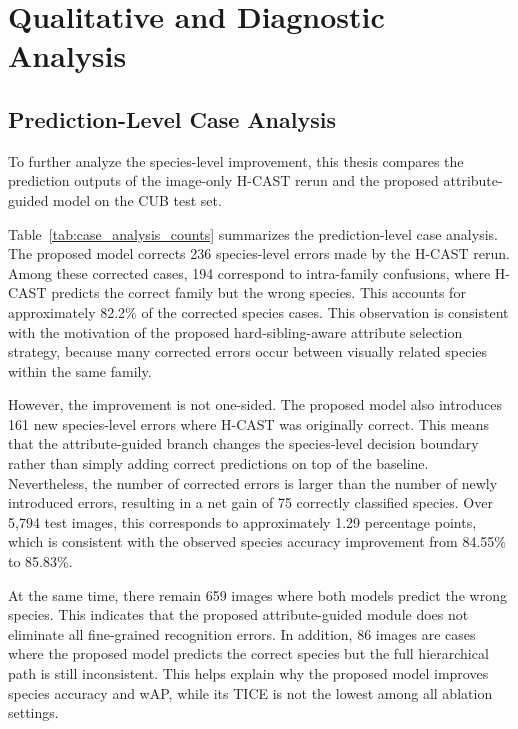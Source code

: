 \section{Qualitative and Diagnostic Analysis}















\subsection{Prediction-Level Case Analysis}

To further analyze the species-level improvement, this thesis compares the prediction outputs of the image-only H-CAST rerun and the proposed attribute-guided model on the CUB test set.

Table~\ref{tab:case_analysis_counts} summarizes the prediction-level case analysis. The proposed model corrects 236 species-level errors made by the H-CAST rerun. Among these corrected cases, 194 correspond to intra-family confusions, where H-CAST predicts the correct family but the wrong species. This accounts for approximately 82.2\% of the corrected species cases. This observation is consistent with the motivation of the proposed hard-sibling-aware attribute selection strategy, because many corrected errors occur between visually related species within the same family.

However, the improvement is not one-sided. The proposed model also introduces 161 new species-level errors where H-CAST was originally correct. This means that the attribute-guided branch changes the species-level decision boundary rather than simply adding correct predictions on top of the baseline. Nevertheless, the number of corrected errors is larger than the number of newly introduced errors, resulting in a net gain of 75 correctly classified species. Over 5,794 test images, this corresponds to approximately 1.29 percentage points, which is consistent with the observed species accuracy improvement from 84.55\% to 85.83\%.

At the same time, there remain 659 images where both models predict the wrong species. This indicates that the proposed attribute-guided module does not eliminate all fine-grained recognition errors. In addition, 86 images are cases where the proposed model predicts the correct species but the full hierarchical path is still inconsistent. This helps explain why the proposed model improves species accuracy and wAP, while its TICE is not the lowest among all ablation settings.

